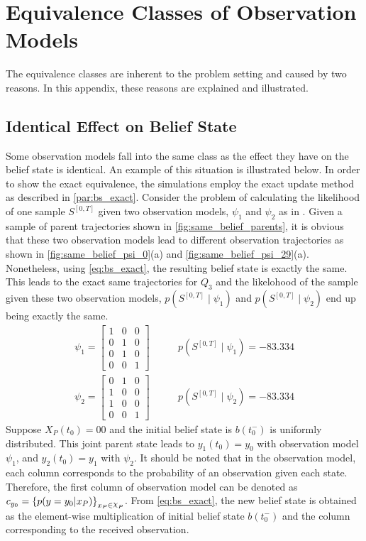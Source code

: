 \chapter{Equivalence Classes of Observation Models}
\label{ap:eq_classes}
The equivalence classes are inherent to the problem setting and caused by two reasons. In this appendix, these reasons are explained and illustrated.
\section*{Identical Effect on Belief State}
\label{ap:eq_classes_same_belief}
Some observation models fall into the same class as the effect they have on the belief state is identical. An example of this situation is illustrated below. In order to show the exact equivalence, the simulations employ the exact update method as described in \cref{par:bs_exact}. Consider the problem of calculating the likelihood of one sample $ S^{[0,T]} $ given two observation models, $ \psi_1 $ and $ \psi_2 $ as in . Given a sample of parent trajectories shown in \autoref{fig:same_belief_parents}, it is obvious that these two observation models lead to different observation trajectories as shown in \autoref{fig:same_belief_psi_0}(a) and \autoref{fig:same_belief_psi_29}(a). Nonetheless, using \autoref{eq:bs_exact}, the resulting belief state is exactly the same. This leads to the exact same trajectories for $ Q_3 $ and the likelohood of the sample given these two observation models, $ p(S^{[0,T]} \mid \psi_1 ) $ and $ p(S^{[0,T]} \mid \psi_2 ) $ end up being exactly the same. 
\begin{align}
\psi_{1} =
\begin{bmatrix}
1 & 0 & 0 \\
0 & 1 & 0 \\
0 & 1 & 0 \\
0 & 0 & 1
\end{bmatrix} &\quad \quad
p(S^{[0,T]} \mid \psi_1 ) = -83.334 \label{eq:psi_1_0}\\
\psi_{2} =
\begin{bmatrix}
0 & 1 & 0 \\
1 & 0 & 0 \\
1 & 0 & 0 \\
0 & 0 & 1
\end{bmatrix} &\quad \quad
p(S^{[0,T]} \mid \psi_2 ) = -83.334
\label{eq:psi_29}
\end{align}
Suppose $ X_P(t_0) = 00 $ and the initial belief state is $ b(t_0^-) $ is uniformly distributed. This joint parent state leads to $ y_1(t_0) = y_0 $ with observation model $ \psi_1 $, and $ y_2(t_0) = y_1 $ with $ \psi_2 $. It should be noted that in the observation model, each column corresponds to the probability of an observation given each state. Therefore, the first column of observation model can be denoted as $ c_{y_0} = \left\lbrace p(y=y_0|x_P)\right\rbrace_{x_P \in \rchi_P}  $. From \autoref{eq:bs_exact}, the new belief state is obtained as the element-wise multiplication of initial belief state $ b(t_0^-) $ and the column corresponding to the received observation.
